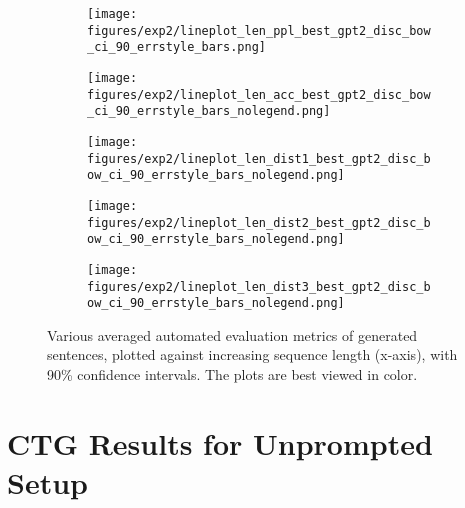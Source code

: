 \begin{figure}[H]
     \centering
     \begin{subfigure}[b]{0.32\textwidth}
        \centering
        \texttt{[image: figures/exp2/lineplot\_len\_ppl\_best\_gpt2\_disc\_bow\_ci\_90\_errstyle\_bars.png]}
        \caption{}
        \label{fig:ctg_lineplot_len_vs_ppl}
     \end{subfigure}
    \quad
     \begin{subfigure}[b]{0.32\textwidth}
        \centering
        \texttt{[image: figures/exp2/lineplot\_len\_acc\_best\_gpt2\_disc\_bow\_ci\_90\_errstyle\_bars\_nolegend.png]}
        \caption{}
        \label{fig:ctg_lineplot_len_vs_acc}
     \end{subfigure}
     \begin{subfigure}[b]{0.32\textwidth}
        \centering
        \texttt{[image: figures/exp2/lineplot\_len\_dist1\_best\_gpt2\_disc\_bow\_ci\_90\_errstyle\_bars\_nolegend.png]}
        \caption{}
        \label{fig:ctg_lineplot_len_vs_dist1}
     \end{subfigure}
     
     \medskip
     
     \begin{subfigure}[b]{0.32\textwidth}
        \centering
        \texttt{[image: figures/exp2/lineplot\_len\_dist2\_best\_gpt2\_disc\_bow\_ci\_90\_errstyle\_bars\_nolegend.png]}
        \caption{}
        \label{fig:ctg_lineplot_len_vs_dist2}
     \end{subfigure}
     \quad
     \begin{subfigure}[b]{0.32\textwidth}
        \centering
        \texttt{[image: figures/exp2/lineplot\_len\_dist3\_best\_gpt2\_disc\_bow\_ci\_90\_errstyle\_bars\_nolegend.png]}
        \caption{}
        \label{fig:ctg_lineplot_len_vs_dist3}
     \end{subfigure}
     
        \caption{ Various averaged automated evaluation metrics of generated sentences, plotted against increasing sequence length (x-axis), with 90\% confidence intervals. The plots are best viewed in color.}
        \label{fig:ctg_lineplots_len_vs_metrics}
\end{figure}

\section{CTG Results for Unprompted Setup }
\label{sec:unprompted}

